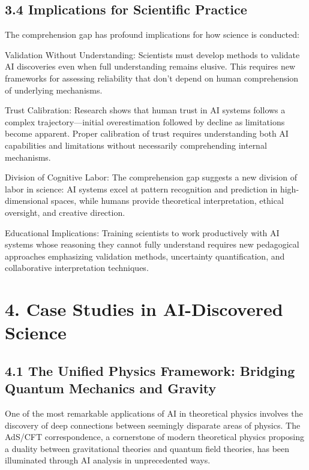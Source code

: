 \documentclass{article}
\begin{document}
\subsection{3.4 Implications for Scientific Practice}

The comprehension gap has profound implications for how science is conducted:


Validation Without Understanding: Scientists must develop methods to validate AI discoveries even when full understanding remains elusive. This requires new frameworks for assessing reliability that don't depend on human comprehension of underlying mechanisms.


Trust Calibration: Research shows that human trust in AI systems follows a complex trajectory—initial overestimation followed by decline as limitations become apparent. Proper calibration of trust requires understanding both AI capabilities and limitations without necessarily comprehending internal mechanisms.


Division of Cognitive Labor: The comprehension gap suggests a new division of labor in science: AI systems excel at pattern recognition and prediction in high-dimensional spaces, while humans provide theoretical interpretation, ethical oversight, and creative direction.


Educational Implications: Training scientists to work productively with AI systems whose reasoning they cannot fully understand requires new pedagogical approaches emphasizing validation methods, uncertainty quantification, and collaborative interpretation techniques.


\section{4. Case Studies in AI-Discovered Science}

\subsection{4.1 The Unified Physics Framework: Bridging Quantum Mechanics and Gravity}

One of the most remarkable applications of AI in theoretical physics involves the discovery of deep connections between seemingly disparate areas of physics. The AdS/CFT correspondence, a cornerstone of modern theoretical physics proposing a duality between gravitational theories and quantum field theories, has been illuminated through AI analysis in unprecedented ways.
\end{document}
